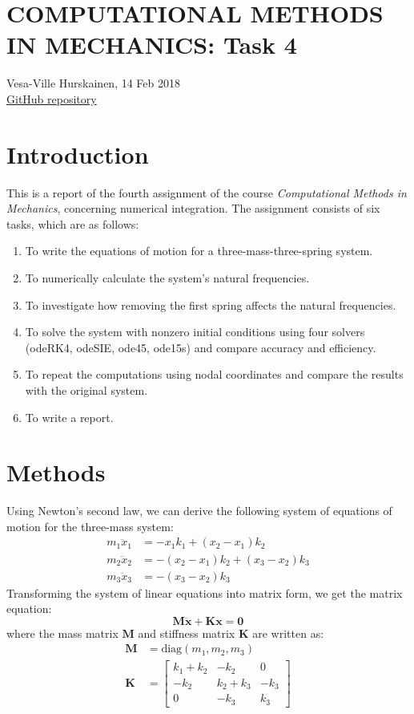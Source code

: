 \documentclass{article}
\begin{document}
	\section*{COMPUTATIONAL METHODS IN MECHANICS: Task 4}
	Vesa-Ville Hurskainen, 14 Feb 2018\\
	\href{https://github.com/VesaVilleHurskainen/cmim2018}{GitHub repository}

	\section*{Introduction}
	This is a report of the fourth assignment of the course \textit{Computational Methods in Mechanics}, concerning numerical integration. The assignment consists of six tasks, which are as follows:
	
	\begin{enumerate}
		\setlength\itemsep{0pt}
		\item To write the equations of motion for a three-mass-three-spring system.
		\item To numerically calculate the system's natural frequencies.
		\item To investigate how removing the first spring affects the natural frequencies.
		\item To solve the system with nonzero initial conditions using four solvers (odeRK4, odeSIE, ode45, ode15s) and compare accuracy and
		efficiency.
		\item To repeat the computations using nodal coordinates and compare the results with the original system.
		\item To write a report.
	\end{enumerate}

	\section*{Methods}
	Using Newton's second law, we can derive the following system of equations of motion for the three-mass system: 
	\begin{equation}
		\begin{aligned}
		m_1 \ddot{x}_1 & = - x_1 k_1 + (x_2 - x_1) k_2 \\
		m_2 \ddot{x}_2 & = - (x_2 - x_1) k_2 + (x_3 - x_2) k_3\\
		m_3 \ddot{x}_3 & = - (x_3 - x_2) k_3
		\end{aligned}
	\end{equation}
	Transforming the system of linear equations into matrix form, we get the matrix equation:
	\begin{equation}
		\mathbf{M} \ddot{\bm{x}} + \mathbf{K} \bm{x} = \bm{0}
	\end{equation}
	where the mass matrix $\mathbf{M}$ and stiffness matrix $\mathbf{K}$ are written as:
	\begin{align}
		\mathbf{M} &= \text{diag}(m_1, m_2, m_3) \\
		\mathbf{K} &= \begin{bmatrix}
		k_1 + k_2 & -k_2 & 0 \\
		-k_2 & k_2 + k_3 & - k_3 \\
		0 & -k_3 & k_3
		\end{bmatrix}
	\end{align}
	
\end{document}
